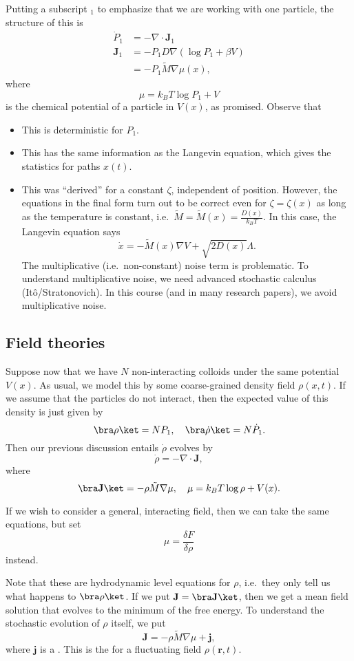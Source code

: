 \documentclass[a4paper]{article}
\begin{document}
Putting a subscript $_1$ to emphasize that we are working with one particle, the structure of this is
\begin{align*}
  \dot{P}_1 &= - \nabla \cdot \mathbf{J}_1\\
  \mathbf{J}_1 &= -P_1 D \nabla (\log P_1 + \beta V)\\
  &= -P_1 \tilde{M} \nabla \mu(x),
\end{align*}
where
\[
  \mu = k_B T \log P_1 + V
\]
is the chemical potential of a particle in $V(x)$, as promised. Observe that
\begin{itemize}
  \item This is deterministic for $P_1$.
  \item This has the same information as the Langevin equation, which gives the statistics for paths $x(t)$.
  \item This was ``derived'' for a constant $\zeta$, independent of position. However, the equations in the final form turn out to be correct even for $\zeta = \zeta(x)$ as long as the temperature is constant, i.e.\ $\tilde{M} = \tilde{M}(x) = \frac{D(x)}{k_B T}$. In this case, the Langevin equation says
    \[
      \dot{x} = - \tilde{M}(x) \nabla V + \sqrt{2 D(x)} \Lambda.
    \]
    The multiplicative (i.e.\ non-constant) noise term is problematic. To understand multiplicative noise, we need advanced stochastic calculus (It\^o/Stratonovich). In this course (and in many research papers), we avoid multiplicative noise.
\end{itemize}

\subsection{Field theories}
Suppose now that we have $N$ non-interacting colloids under the same potential $V(x)$. As usual, we model this by some coarse-grained density field $\rho(x, t)$. If we assume that the particles do not interact, then the expected value of this density is just given by
\[
  \bra \rho\ket = NP_1,\quad \bra \dot{\rho}\ket = N \dot{P}_1.
\]
Then our previous discussion entails $\dot{\rho}$ evolves by
\[
  \dot{\rho} = - \nabla \cdot \mathbf{J},
\]
where
\[
  \bra \mathbf{J}\ket = - \rho \tilde{M} \nabla \mu,\quad \mu = k_B T \log \rho + V(x).
\]

If we wish to consider a general, interacting field, then we can take the same equations, but set
\[
  \mu = \frac{\delta F}{\delta \rho}
\]
instead.

Note that these are hydrodynamic level equations for $\rho$, i.e.\ they only tell us what happens to $\bra \rho\ket$. If we put $\mathbf{J} = \bra \mathbf{J}\ket$, then we get a mean field solution that evolves to the minimum of the free energy. To understand the stochastic evolution of $\rho$ itself, we put
\[
  \mathbf{J} = - \rho \tilde{M} \nabla \mu + \mathbf{j},
\]
where $\mathbf{j}$ is a . This is the  for a fluctuating field $\rho(\mathbf{r}, t)$.
\end{document}
